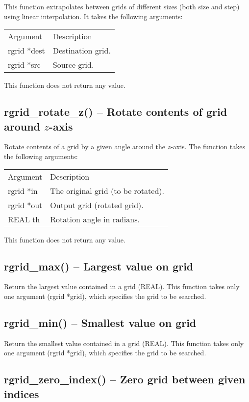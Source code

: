 \documentclass[12pt,letterpaper]{report}
\begin{document}
This function extrapolates between grids of different sizes (both size and step) using linear interpolation. It takes the following arguments:
\begin{longtable}{p{} p{}}
Argument & Description\\
\cline{1-2}
rgrid *dest & Destination grid.\\
rgrid *src  & Source grid.\\
\end{longtable}
\noindent
This function does not return any value. 

\subsection{rgrid\_rotate\_z() -- Rotate contents of grid around $z$-axis}

Rotate contents of a grid by a given angle around the $z$-axis. The function takes the following arguments:
\begin{longtable}{p{} p{}}
Argument & Description\\
\cline{1-2}
rgrid *in & The original grid (to be rotated).\\                                                                                
rgrid *out & Output grid (rotated grid).\\
REAL th & Rotation angle in radians.\\
\end{longtable}
\noindent
This function does not return any value. 

\subsection{rgrid\_max() -- Largest value on grid}

Return the largest value contained in a grid (REAL). This function takes only one argument (rgrid *grid), which specifies the grid to be searched.

\subsection{rgrid\_min() -- Smallest value on grid}

Return the smallest value contained in a grid (REAL). This function takes only one argument (rgrid *grid), which specifies the grid to be searched.

\subsection{rgrid\_zero\_index() -- Zero grid between given indices}
\end{document}
